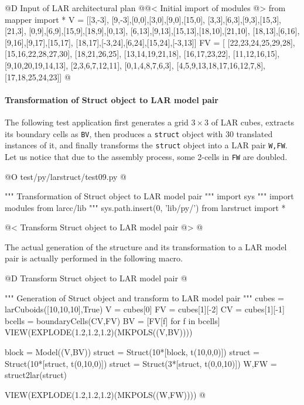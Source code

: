 \documentclass[11pt,oneside]{article}    %
\begin{document}
@D Input of LAR architectural plan
@{@< Initial import of modules @>
from mapper import *
V = [[3,-3],
[9,-3],[0,0],[3,0],[9,0],[15,0],
[3,3],[6,3],[9,3],[15,3],[21,3], 
[0,9],[6,9],[15,9],[18,9],[0,13],
[6,13],[9,13],[15,13],[18,10],[21,10], 
[18,13],[6,16],[9,16],[9,17],[15,17],
[18,17],[-3,24],[6,24],[15,24],[-3,13]]
FV = [
[22,23,24,25,29,28], [15,16,22,28,27,30], [18,21,26,25], 
[13,14,19,21,18], [16,17,23,22], [11,12,16,15],
[9,10,20,19,14,13], [2,3,6,7,12,11], [0,1,4,8,7,6,3],
[4,5,9,13,18,17,16,12,7,8],[17,18,25,24,23]]
@}



\paragraph{Transformation of Struct object to LAR model pair}

The following test application first generates a grid $3\times 3$ of LAR cubes, extracts
its boundary cells as \texttt{BV}, then produces a \texttt{struct} object with 30 translated instances of it,
and finally transforms the \texttt{struct} object into a LAR pair \texttt{W,FW}.
Let us notice that due to the assembly process, some 2-cells in \texttt{FW} are doubled.

@O test/py/larstruct/test09.py
@{""" Transformation of Struct object to LAR model pair """
import sys
""" import modules from larcc/lib """
sys.path.insert(0, 'lib/py/')
from larstruct import *

@< Transform Struct object to LAR model pair @>
@}

The actual generation of the structure and its transformation to a LAR model pair is actually performed in the following macro.

@D Transform Struct object to LAR model pair
@{""" Generation of Struct object and transform to LAR model pair """
cubes = larCuboids([10,10,10],True)
V = cubes[0]
FV = cubes[1][-2]
CV = cubes[1][-1]
bcells = boundaryCells(CV,FV)
BV = [FV[f] for f in bcells]
VIEW(EXPLODE(1.2,1.2,1.2)(MKPOLS((V,BV))))

block = Model((V,BV))
struct = Struct(10*[block, t(10,0,0)])
struct = Struct(10*[struct, t(0,10,0)])
struct = Struct(3*[struct, t(0,0,10)])
W,FW = struct2lar(struct)

VIEW(EXPLODE(1.2,1.2,1.2)(MKPOLS((W,FW))))
@}
\end{document}
